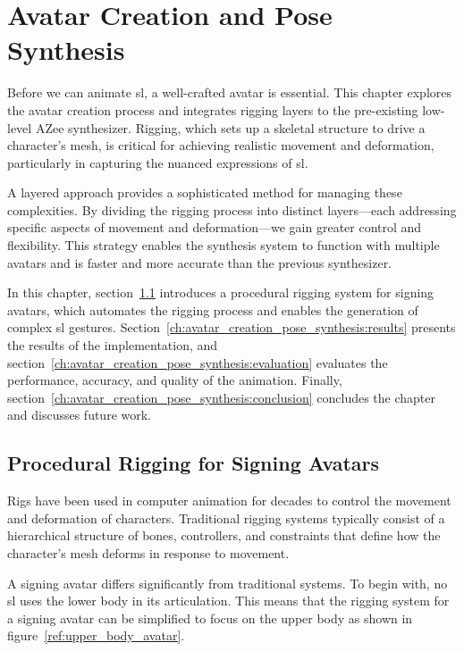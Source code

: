 \documentclass[../../main.tex]{subfiles}
\begin{document}
\chapter{Avatar Creation and Pose Synthesis}
\label{ch:avatar_creation_pose_synthesis}

Before we can animate \gls{sl}, a well-crafted avatar is essential. This chapter explores the avatar creation process and integrates rigging layers to the pre-existing low-level AZee synthesizer. Rigging, which sets up a skeletal structure to drive a character's mesh, is critical for achieving realistic movement and deformation, particularly in capturing the nuanced expressions of \gls{sl}.

A layered approach provides a sophisticated method for managing these complexities. By dividing the rigging process into distinct layers—each addressing specific aspects of movement and deformation—we gain greater control and flexibility. This strategy enables the synthesis system to function with multiple avatars and is faster and more accurate than the previous synthesizer.

In this chapter, section~\ref{ch:avatar_creation_pose_synthesis:proc_rig_signing_avatars} introduces a procedural rigging system for signing avatars, which automates the rigging process and enables the generation of complex \gls{sl} gestures. Section~\ref{ch:avatar_creation_pose_synthesis:results} presents the results of the implementation, and section~\ref{ch:avatar_creation_pose_synthesis:evaluation} evaluates the performance, accuracy, and quality of the animation. Finally, section~\ref{ch:avatar_creation_pose_synthesis:conclusion} concludes the chapter and discusses future work.

\section{Procedural Rigging for Signing Avatars}
\label{ch:avatar_creation_pose_synthesis:proc_rig_signing_avatars}

Rigs have been used in computer animation for decades to control the movement and deformation of characters. Traditional rigging systems typically consist of a hierarchical structure of bones, controllers, and constraints that define how the character’s mesh deforms in response to movement.

A signing avatar differs significantly from traditional systems. To begin with, no \gls{sl} uses the lower body in its articulation. This means that the rigging system for a signing avatar can be simplified to focus on the upper body as shown in figure~\ref{ref:upper_body_avatar}. 
\end{document}
